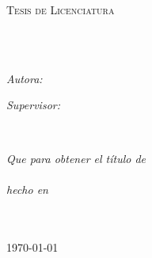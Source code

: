 \documentclass[
11pt, %
spanish, %
singlespacing, %
headsepline, %
]{MastersDoctoralThesis} %
\author{Adriana F. Chávez De la Peña}%
\begin{document}
\frontmatter %

\pagestyle{plain} %


\begin{titlepage}
\begin{center}

\vspace*{.06\textheight}
{\scshape\LARGE \univname\par}\vspace{1.5cm} %
\textsc{\Large Tesis de Licenciatura}\\[0.5cm] %

\HRule \\[0.4cm] %
{\huge \bfseries \ttitle\par}\vspace{0.4cm} %
\HRule \\[1.5cm] %
 
\begin{minipage}[t]{0.4\textwidth}
\begin{flushleft} \large
\emph{Autora:}\\
\href{adrifelcha@gmail.com}{\authorname} %
\end{flushleft}
\end{minipage}
\begin{minipage}[t]{0.4\textwidth}
\begin{flushright} \large
\emph{Supervisor:} \\
\href{abouzasr@gmail.com}{\supname} %
\end{flushright}
\end{minipage}\\[3cm]
 
\vfill

\large \textit{Que para obtener el título de\\ \degreename}\\[0.3cm] %
\textit{hecho en}\\[0.4cm]
\groupname\\\deptname\\[2cm] %
 
\vfill

{\large \today}\\[4cm] %
 
\vfill
\end{center}
\end{titlepage}
\end{document}
